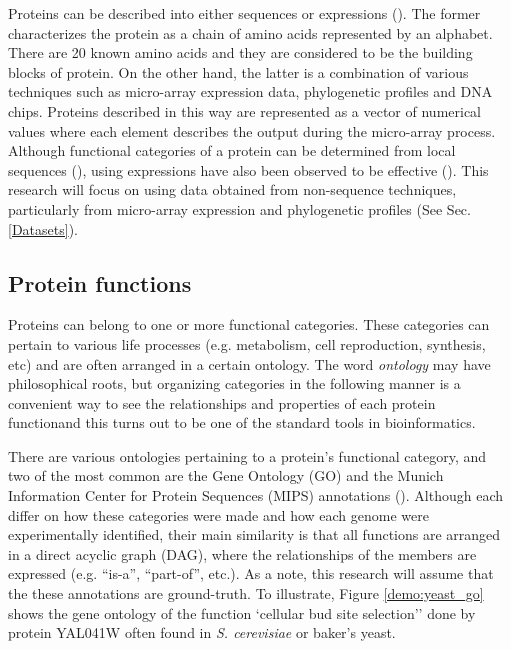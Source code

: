 Proteins can be described into either sequences or expressions (\cite{xiong2006essential}).
The former characterizes the protein as a chain of amino acids represented by
an alphabet. There are 20 known amino acids and they are considered to be the
building blocks of protein. On the other hand, the latter is a
combination of various techniques such as micro-array expression data,
phylogenetic profiles and DNA chips. Proteins described in this way are
represented as a vector of numerical values where each element describes the
output during the micro-array process. Although functional categories of a protein
can be determined from local sequences (\cite{devos2000practical}), using
expressions have also been observed to be effective
(\cite{eisenberg2000protein, marcotte1999combined}). This research will
focus on using data obtained from non-sequence techniques, particularly from
micro-array expression and phylogenetic profiles (See Sec. \ref{Datasets}).

\subsection{Protein functions}

\par Proteins can belong to one or more functional categories.
These categories can pertain to various life processes (e.g. metabolism, cell
reproduction, synthesis, etc) and are often arranged in a certain ontology.
The word \textit{ontology} may have philosophical roots, but organizing
categories in the following manner is a convenient way to see the relationships and 
properties of each protein function\textemdash and this turns out to be one of the 
standard tools in bioinformatics.

\par There are various ontologies pertaining to a protein's functional category, and
two of the most common are the Gene Ontology (GO) and the Munich Information
Center for Protein Sequences (MIPS) annotations (\cite{gaudet2017gene,
mewes2006mips}). Although each differ on how these categories were made and how
each genome were experimentally identified, their main similarity is that all
functions are arranged in a direct acyclic graph (DAG), where the
relationships of the members are expressed (e.g. ``is-a'', ``part-of'', etc.).
As a note, this research will assume that the these annotations are
ground-truth. To illustrate, Figure \ref{demo:yeast_go} shows the gene ontology of the 
function `cellular bud site selection'' done by protein YAL041W often found in
\textit{S. cerevisiae} or baker's yeast.

